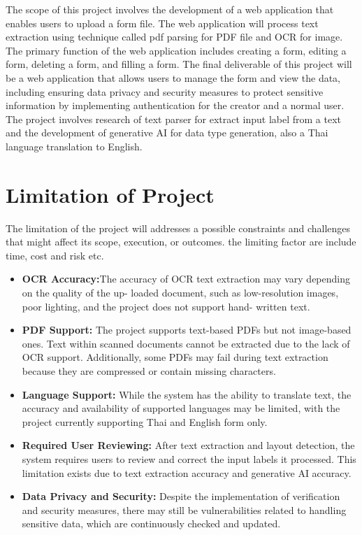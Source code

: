 \documentclass[12pt,oneside,openright,a4paper]{cpe-english-project}
\begin{document}
The scope of this project involves the development of a web application that enables users to upload a form file. The web application will process text extraction using technique called pdf parsing for PDF file and OCR for image. The primary function of the web application includes creating a form, editing a form, deleting a form, and filling a form. The final deliverable of this project will be a web application that allows users to manage the form and view the data, including ensuring data privacy and security measures to protect sensitive information by implementing authentication for the creator and a normal user. The project involves research of text parser for extract input label from a text and the development of generative AI for data type generation, also a Thai language translation to English.


\section{Limitation of Project}
The limitation of the project will addresses a possible constraints and challenges that might affect its scope, execution, or outcomes. the limiting factor are include time, cost and risk etc.

\begin{itemize} 
\item \textbf{OCR Accuracy:}The accuracy of OCR text extraction may vary depending on the quality of the up-
loaded document, such as low-resolution images, poor lighting, and the project does not support hand-
written text.
 \item \textbf{PDF Support:} The project supports text-based PDFs but not image-based ones. Text within scanned documents cannot be extracted due to the lack of OCR support. Additionally, some PDFs may fail during text extraction because they are compressed or contain missing characters.
  
    \item \textbf{Language Support:} While the system has the ability to translate text, the accuracy and availability of supported languages may be limited, with the project currently supporting Thai and English form only.
    
    \item \textbf{Required User Reviewing:} After text extraction and layout detection, the system requires users to review and correct the input labels it processed. This limitation exists due to text extraction accuracy and generative AI accuracy.
      
    \item \textbf{Data Privacy and Security:} Despite the implementation of verification and security measures, there may still be vulnerabilities related to handling sensitive data, which are continuously checked and updated.
\end{itemize}
\end{document}
